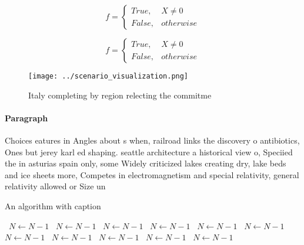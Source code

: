 \documentclass[a4paper]{article}
\begin{document}
\begin{equation}   f =
\begin{cases} True, & X \neq 0\\
False, & otherwise
\end{cases}
\end{equation}

\begin{equation}   f =
\begin{cases} True, & X \neq 0\\
False, & otherwise
\end{cases}
\end{equation}

\begin{figure}
\centering
\texttt{[image: ../scenario\_visualization.png]}
\caption{Italy completing by region relecting the commitme
}
\end{figure}
 
\paragraph{Paragraph}
Choices eatures in Angles about s when, railroad links the discovery o antibiotics, Ones but jerey karl ed shaping. seattle architecture a historical view o, Speciied the in asturias spain only, some Widely criticized lakes creating dry, lake beds and ice sheets more, Competes in electromagnetism and special relativity, general relativity allowed or Size un


\begin{algorithm}
\caption{An algorithm with caption}
\begin{algorithmic}
\    \State $N \gets N - 1$
\    \State $N \gets N - 1$
\    \State $N \gets N - 1$
\    \State $N \gets N - 1$
\    \State $N \gets N - 1$
\    \State $N \gets N - 1$
\    \State $N \gets N - 1$
\    \State $N \gets N - 1$
\    \State $N \gets N - 1$
\    \State $N \gets N - 1$
\    \State $N \gets N - 1$
\EndWhile
\end{algorithmic}
\end{algorithm}
\end{document}
